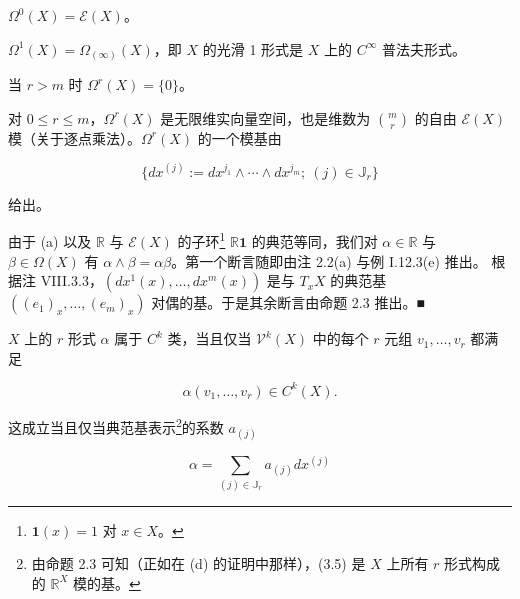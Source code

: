 \begin{remark}

\begin{items}
\item

$ \Omega^{0}(X) = \mathcal{E}(X) $。

\item

$ \Omega^{1}(X) = \Omega_{(\infty)}(X) $，即 $ X $ 的光滑 1 形式是 $ X $ 上的 $ C^{\infty} $ 普法夫形式。

\item

当 $ r > m $ 时 $ \Omega^{r}(X) = \{0\} $。

\item

对 $ 0 \le r \le m $，$ \Omega^{r}(X) $ 是无限维实向量空间，也是维数为 $ \binom{m}{r} $ 的自由 $ \mathcal{E}(X) $ 模（关于逐点乘法）。$ \Omega^{r}(X) $ 的一个模基由

\begin{equation}
\{ dx^{(j)} := dx^{j_{1}} \wedge \cdots \wedge dx^{j_{m}} ;\ (j) \in \mathbb{J}_{r} \}\tag{3.5}
\end{equation}

给出。

\proofhead
由于 (a) 以及 $ \mathbb{R} $ 与 $ \mathcal{E}(X) $ 的子环\footnote{$ \mathbf{1}(x) = 1 $ 对 $ x \in X $。} $ \mathbb{R}\mathbf{1} $ 的典范等同，我们对 $ \alpha \in \mathbb{R} $ 与 $ \beta \in \Omega(X) $ 有 $ \alpha \wedge \beta = \alpha\beta $。第一个断言随即由注 2.2(a) 与例 I.12.3(e) 推出。
根据注 VIII.3.3，$ (dx^{1}(x),\ldots,dx^{m}(x)) $ 是与 $ T_{x}X $ 的典范基 $ ((e_{1})_{x},\ldots,(e_{m})_{x}) $ 对偶的基。于是其余断言由命题 2.3 推出。\nobreak\hspace{0.35em}■
\item

$ X $ 上的 $ r $ 形式 $ \alpha $ 属于 $ C^{k} $ 类，当且仅当 $ \mathcal{V}^{k}(X) $ 中的每个 $ r $ 元组 $ v_{1},\ldots,v_{r} $ 都满足

\begin{equation}
\alpha(v_{1},\ldots,v_{r}) \in C^{k}(X).\tag{3.6}
\end{equation}

这成立当且仅当典范基表示\footnote{由命题 2.3 可知（正如在 (d) 的证明中那样），(3.5) 是 $ X $ 上所有 $ r $ 形式构成的 $ \mathbb{R}^{X} $ 模的基。}的系数 $ a_{(j)} $

\begin{equation}
\alpha = \sum_{(j) \in \mathbb{J}_{r}} a_{(j)} dx^{(j)}\tag{3.7}
\end{equation}


\end{items}
\end{remark}
